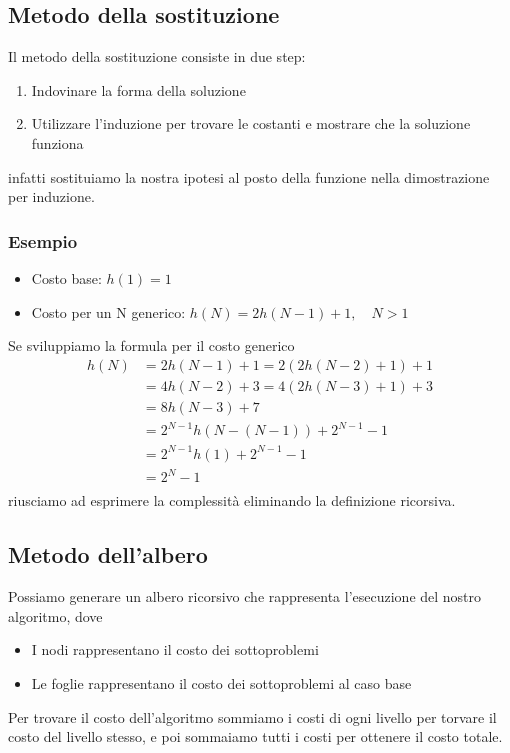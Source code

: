 \documentclass{article}
\begin{document}
\subsection*{Metodo della sostituzione}
Il metodo della sostituzione consiste in due step:
\begin{enumerate}
  \item Indovinare la forma della soluzione
  \item Utilizzare l'induzione per trovare le costanti e mostrare che la soluzione funziona
\end{enumerate}
infatti sostituiamo la nostra ipotesi al posto della funzione nella dimostrazione per induzione.
\subsubsection*{Esempio}
\begin{itemize}
  \item Costo base: \(h(1) = 1\)
  \item Costo per un N generico: \(h(N) = 2h(N - 1) + 1,\quad N > 1\)
\end{itemize}
Se sviluppiamo la formula per il costo generico
\begin{align*}
  h(N) & = 2h(N - 1) + 1 = 2(2h(N - 2) + 1) + 1           \\
       & = 4h(N - 2) + 3 = 4(2h(N - 3) + 1) + 3           \\
       & = 8h(N - 3) + 7                                  \\
       & = 2^{N-1}h\left(N - (N - 1)\right) + 2^{N-1} - 1 \\
       & = 2^{N-1}h(1) + 2^{N-1} - 1                      \\
       & = 2^{N} - 1                                      \\
\end{align*}
riusciamo ad esprimere la complessità eliminando la definizione ricorsiva.
\subsection*{Metodo dell'albero}
Possiamo generare un albero ricorsivo che rappresenta l'esecuzione del nostro algoritmo, dove
\begin{itemize}
  \item I nodi rappresentano il costo dei sottoproblemi
  \item Le foglie rappresentano il costo dei sottoproblemi al caso base
\end{itemize}
Per trovare il costo dell'algoritmo sommiamo i costi di ogni livello per torvare il costo del livello stesso, e poi sommaiamo tutti i costi per ottenere il costo totale.
\pagebreak
\end{document}
